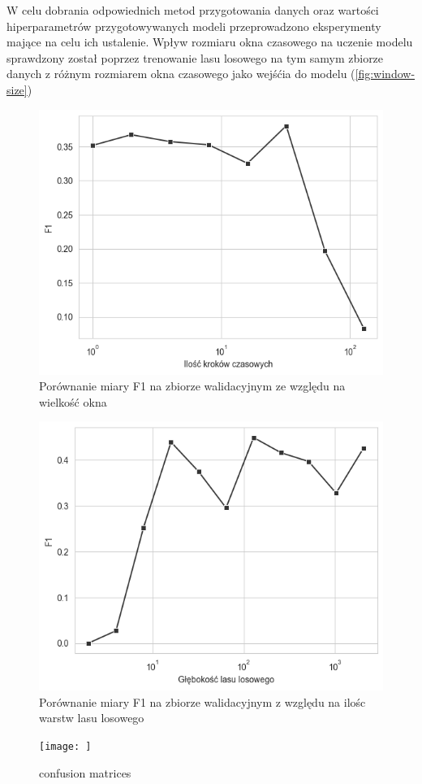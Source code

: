 \documentclass{./assets/wfis}
\begin{document}
W celu dobrania odpowiednich metod przygotowania danych oraz wartości hiperparametrów przygotowywanych modeli przeprowadzono eksperymenty mające na celu ich ustalenie. Wpływ rozmiaru okna czasowego na uczenie modelu sprawdzony został poprzez trenowanie lasu losowego na tym samym zbiorze danych z różnym rozmiarem okna czasowego jako wejśćia do modelu (\autoref{fig:window-size})

\begin{figure}[h!]
    \centering
    \includegraphics[width=0.5\columnwidth]{thesis/assets/window_size_vs_f1.png}
    \caption{Porównanie miary F1 na zbiorze walidacyjnym ze względu na wielkość okna}
    \label{fig:window-size}
\end{figure}

\begin{figure}[h!]
    \centering
    \includegraphics[width=0.5\columnwidth]{thesis/assets/forest_depth_vs_f1.png}
    \caption{Porównanie miary F1 na zbiorze walidacyjnym z względu na ilośc warstw lasu losowego}
    \label{fig:rf-num-nodes}
\end{figure}



\begin{figure}[h!]
    \centering
    \texttt{[image: ]}
    \caption{confusion matrices}
    \label{fig:confusion-matricies}
\end{figure}
\end{document}
